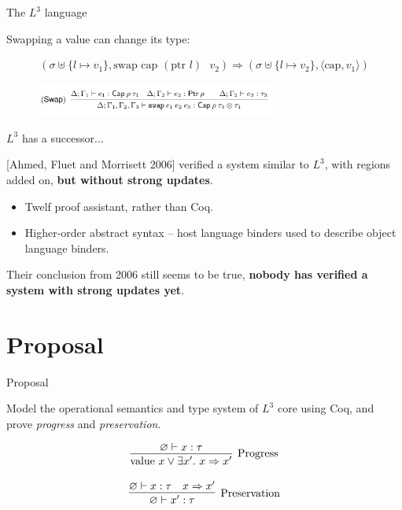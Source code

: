 \documentclass[10pt]{beamer}
\let\emptyset\varnothing
\newcommand{\steps}{\Rightarrow}
\newcommand{\capa}{\text{cap}}
\newcommand{\ptr}{\text{ptr }}
\begin{document}
\begin{frame}{The \textbf{$L^3$} language}

Swapping a value can change its type:

\begin{eqnarray*}
(\sigma \uplus \{l \mapsto v_1\}, \text{swap cap } (\ptr l) \text{ } v_2)
	\Rightarrow
	(\sigma \uplus \{l \mapsto v_2\}, \langle \capa, v_1 \rangle)
\end{eqnarray*}

\begin{figure}[h]
\centering
\includegraphics[width=300px]{L3_swap_rule.png}
\label{}
\end{figure}

\end{frame}

\begin{frame}{$L^3$ has a successor...}

[Ahmed, Fluet and Morrisett 2006] verified a system similar to $L^3$, with regions added on, \textbf{but without strong updates}.

\begin{itemize}
\item Twelf proof assistant, rather than Coq.
\item Higher-order abstract syntax -- host language binders used to describe object language binders.
\end{itemize}

Their conclusion from 2006 still seems to be true, \textbf{nobody has verified a system with strong updates yet}.

\end{frame}

\section{Proposal}

\begin{frame}{Proposal}

Model the operational semantics and type system of $L^3$ core using Coq, and prove \textit{progress} and \textit{preservation}.

$$
\infer[\text{Progress}]{\text{value } x \lor \exists x'.\text{ }x \steps x'}{
    \emptyset \vdash x : \tau
}
$$

$$
\infer[\text{Preservation}]{\emptyset \vdash x' : \tau}{
    \emptyset \vdash x : \tau \quad x \steps x'
}
$$

\end{frame}
\end{document}

